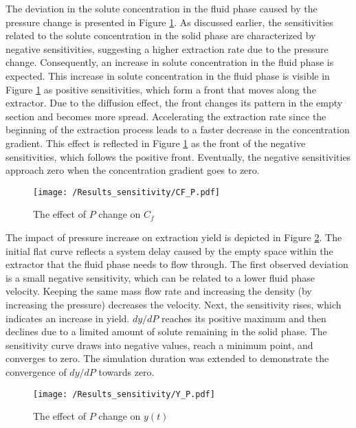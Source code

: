 \documentclass[../Article_Design_of_Experiment.tex]{subfiles}
\begin{document}
	The deviation in the solute concentration in the fluid phase caused by the pressure change is presented in Figure \ref{fig:Sensitivty_P_CF}. As discussed earlier, the sensitivities related to the solute concentration in the solid phase are characterized by negative sensitivities, suggesting a higher extraction rate due to the pressure change. Consequently, an increase in solute concentration in the fluid phase is expected. This increase in solute concentration in the fluid phase is visible in Figure \ref{fig:Sensitivty_P_CF} as positive sensitivities, which form a front that moves along the extractor. Due to the diffusion effect, the front changes its pattern in the empty section and becomes more spread. Accelerating the extraction rate since the beginning of the extraction process leads to a faster decrease in the concentration gradient. This effect is reflected in Figure \ref{fig:Sensitivty_P_CF} as the front of the negative sensitivities, which follows the positive front. Eventually, the negative sensitivities approach zero when the concentration gradient goes to zero.

	\begin{figure}[h!]
		\centering
		\texttt{[image: /Results\_sensitivity/CF\_P.pdf]}
		\caption{The effect of $P$ change on $C_f$}
		\label{fig:Sensitivty_P_CF}
	\end{figure}

	The impact of pressure increase on extraction yield is depicted in Figure \ref{fig:Sensitivty_P_y}. The initial flat curve reflects a system delay caused by the empty space within the extractor that the fluid phase needs to flow through. The first observed deviation is a small negative sensitivity, which can be related to a lower fluid phase velocity. Keeping the same mass flow rate and increasing the density (by increasing the pressure) decreases the velocity. Next, the sensitivity rises, which indicates an increase in yield. $dy / dP$ reaches its positive maximum and then declines due to a limited amount of solute remaining in the solid phase. The sensitivity curve draws into negative values, reach a minimum point, and converges to zero. The simulation duration was extended to demonstrate the convergence of $dy / dP$ towards zero.

	\begin{figure}[h!]
		\centering
		\texttt{[image: /Results\_sensitivity/Y\_P.pdf]}
		\caption{The effect of $P$ change on $y(t)$}
		\label{fig:Sensitivty_P_y}
	\end{figure}
\end{document}
